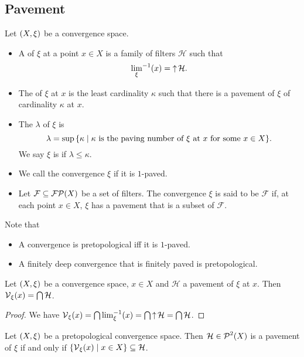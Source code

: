 \subsection{Pavement}
\begin{definition}
Let $\sSet{X,\xi}$ be a convergence space.
\begin{itemize}
\item A  of $\xi$ at a point $x\in X$ is a family of filters $\mathcal{H}$ such that
\[ {\lim_\xi}^{-1}(x) = \operatorname{\uparrow}\mathcal{H}. \]
\item The  of $\xi$ at $x$ is the least cardinality $\kappa$ such that there is a pavement of $\xi$ of cardinality $\kappa$ at $x$.
\item The  $\lambda$ of $\xi$ is
\[ \lambda = \sup\setbuilder{\kappa}{\text{$\kappa$ is the paving number of $\xi$ at $x$ for some $x\in X$}}. \]
We say $\xi$ is  if $\lambda \leq \kappa$.
\item We call the convergence $\xi$  if it is $1$-paved.
\item Let $\mathcal{F} \subseteq \operatorname{\mathcal{FP}}(X)$ be a set of filters. The convergence $\xi$ is said to be  $\mathcal{F}$ if, at each point $x\in X$, $\xi$ has a pavement that is a subset of $\mathcal{F}$.
\end{itemize}
\end{definition}
Note that
\begin{itemize}
\item A convergence is pretopological iff it is $1$-paved.
\item A finitely deep convergence that is finitely paved is pretopological.
\end{itemize}

\begin{lemma} \label{vicinityMeetOfPavement}
Let $\sSet{X,\xi}$ be a convergence space, $x\in X$ and $\mathcal{H}$ a pavement of $\xi$ at $x$. Then $\operatorname{\mathcal{V}}_\xi(x) = \bigcap\mathcal{H}$.
\end{lemma}
\begin{proof}
We have $\operatorname{\mathcal{V}}_\xi(x) = \bigcap\lim^{-1}_{\xi}(x) = \bigcap\operatorname{\uparrow}\mathcal{H} = \bigcap\mathcal{H}$.
\end{proof}

\begin{lemma}
Let $\sSet{X,\xi}$ be a pretopological convergence space. Then $\mathcal{H}\in\operatorname{\mathcal{P}}^2(X)$ is a pavement of $\xi$ \textup{if and only if} $\setbuilder{\vicinity_\xi(x)}{x\in X} \subseteq \mathcal{H}$.
\end{lemma}

